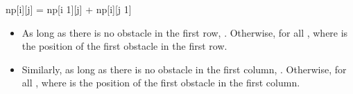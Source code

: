 \documentclass[letterpaper,12pt,english]{book}
\begin{document}
\begin{sphinxVerbatim}[commandchars=\\\{\}]
np[i][j] = np[i \PYGZhy{} 1][j] + np[i][j \PYGZhy{} 1]
\end{sphinxVerbatim}
\begin{itemize}
\item {} 
\sphinxAtStartPar
As long as there is no obstacle in the first row, . Otherwise,  for all , where  is the position of the first obstacle in the first row.

\item {} 
\sphinxAtStartPar
Similarly, as long as there is no obstacle in the first column, . Otherwise,  for all , where  is the position of the first obstacle in the first column.

\end{itemize}
\end{document}
